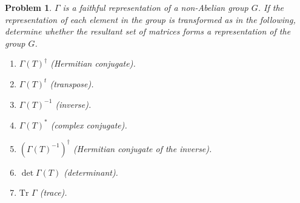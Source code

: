 \documentclass[UTF8,10pt,a4paper]{article}
\theoremstyle{Problem}
\newtheorem{prob}{Problem}
\theoremstyle{Solution}
\newcommand{\Tr}{\text{Tr }}
\begin{document}
\thispagestyle{FirstPageStyle}
\begin{prob}
    $\Gamma$ is a faithful representation of a non-Abelian group $G$. If the representation of each element in the group is transformed as in the following, determine whether the resultant set of matrices forms a representation of the group $G$.
    \begin{enumerate}
        \item[(a)] $\Gamma(T)^{\dagger}$ (Hermitian conjugate).
        \item[(b)] $\Gamma(T)^t$ (transpose).
        \item[(c)] $\Gamma(T)^{-1}$ (inverse).
        \item[(d)] $\Gamma(T)^*$ (complex conjugate).
        \item[(e)] $(\Gamma(T)^{-1})^{\dagger}$ (Hermitian conjugate of the inverse).
        \item[(f)] $\det \Gamma(T)$ (determinant).
        \item[(g)] $\Tr\Gamma$ (trace).
    \end{enumerate}
\end{prob}
\end{document}
